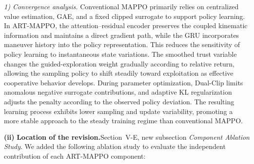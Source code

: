\documentclass[11pt]{article}
\newcommand{\hladd}[1]{{\color{addblue}#1}}
\newcommand{\loc}{\medskip\noindent\textbf{Location of the revision.}\quad}
\begin{document}
\begin{tcolorbox}[enhanced,breakable,colback=white,colframe=addblue!55,
coltext=addblue,fontupper=\color{addblue},boxrule=0.6pt,arc=2pt,
left=9pt,right=9pt,top=7pt,bottom=7pt]
\hladd{\emph{1) Convergence analysis.}
Conventional MAPPO primarily relies on centralized value estimation, GAE, and
a fixed clipped surrogate to support policy learning. In ART-MAPPO, the
attention--residual encoder preserves the coupled kinematic information and
maintains a direct gradient path, while the GRU incorporates maneuver history
into the policy representation. This reduces the sensitivity of policy learning
to instantaneous state variations. The smoothed trust variable changes the
guided-exploration weight gradually according to relative return, allowing the
sampling policy to shift steadily toward exploitation as effective cooperative
behavior develops. During parameter optimization, Dual-Clip limits anomalous
negative surrogate contributions, and adaptive KL regularization adjusts the
penalty according to the observed policy deviation. The resulting learning
process exhibits lower sampling and update variability, promoting a more stable
approach to the steady training regime than conventional MAPPO.}
\end{tcolorbox}

\medskip
\noindent\textbf{(ii)}
\loc Section~V-E, new subsection \emph{Component Ablation Study}. 
We added the following ablation study to evaluate the independent contribution of each ART-MAPPO component:
\end{document}
